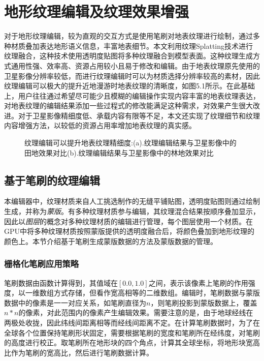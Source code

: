 \chapter{地形纹理编辑及纹理效果增强}
对于地形纹理编辑，较为直观的交互方式是使用笔刷对地表纹理进行绘制，通过多种材质叠加表达地形语义信息，丰富地表细节。本文利用纹理Splatting技术\supercite{splatting}进行纹理融合，这种技术使用透明度贴图将多种纹理融合到模型表面。这种纹理生成方式通用性强、效率高、资源占用较小且易于修改和编辑。由于地表纹理原先使用的卫星影像分辨率较低，而进行纹理编辑时可以为材质选择分辨率较高的素材，因此纹理编辑可以极大的提升近地漫游时地表纹理的清晰度，如图5.1所示。在此基础上，用户往往通过希望尽可能少且模糊的编辑操作实现内容丰富的地表纹理表达，对地表纹理的编辑结果添加一些过程式的修改能满足这种需求，对效果产生很大改进。对于卫星影像精细度低、承载内容有限等不足，本文还实现了纹理细节和纹理内容增强方法，以较低的资源占用率增加地表纹理的真实感。\par
\begin{figure}[htbp]
\centering
{} 
\caption{纹理编辑可以提升地表纹理精细度:(a).纹理编辑结果与卫星影像中的田地效果对比(b).纹理编辑结果与卫星影像中的林地效果对比}
\end{figure}

\section{基于笔刷的纹理编辑}
本编辑器中，纹理材质来自人工挑选制作的无缝平铺贴图，透明度贴图则通过绘制生成，并称为\textit{蒙版}。有多种纹理材质参与编辑，其纹理混合结果按顺序叠加显示，因此以\textit{图层}的概念对多种纹理材质的编辑进行管理，每个图层使用一个材质。在GPU中将多种纹理材质按照蒙版提供的透明度融合后，将颜色叠加到地形纹理的颜色上。本节介绍基于笔刷生成蒙版数据的方法及蒙版数据的管理。

\subsection{栅格化笔刷应用策略}
笔刷数据由函数计算得到，其值域在$[0.0,1.0]$之间，表示该像素上笔刷的作用强度，以一维数组方式存储，但看作宽高相等的二维数组。编辑时，笔刷数据与蒙版数据中的像素是一一对应关系，如笔刷直径为$n$，则笔刷投影到蒙版数据上，覆盖$n*n$的像素，对此范围内的像素产生编辑效果。需要注意的是，由于地球经线在两极处收拢，因此纬线间距离相等而经线间距离不定。在计算笔刷数据时，为了在全球各个位置保持笔刷形状固定，需要根据笔刷的宽度和笔刷所在经纬度，对笔刷的高度进行校正。取笔刷所在地形块的四个角点，计算其全球坐标，将地形块宽高比作为笔刷的宽高比，然后进行笔刷数据计算。\par

